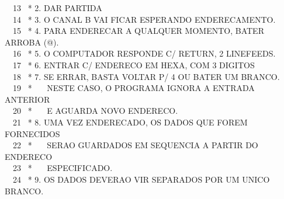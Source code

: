 \documentclass[a4paper,12pt]{article}
\begin{document}
\phantom \ \ 13 \ * 2. DAR PARTIDA\\
\phantom \ \ 14 \ * 3. O CANAL B VAI FICAR ESPERANDO ENDERECAMENTO.\\
\phantom \ \ 15 \ * 4. PARA ENDERECAR A QUALQUER MOMENTO, BATER ARROBA (@).\\
\phantom \ \ 16 \ * 5. O COMPUTADOR RESPONDE C/ RETURN, 2 LINEFEEDS.\\
\phantom \ \ 17 \ * 6. ENTRAR C/ ENDERECO EM HEXA, COM 3 DIGITOS\\
\phantom \ \ 18 \ * 7. SE ERRAR, BASTA VOLTAR P/ 4 OU BATER UM BRANCO.\\
\phantom \ \ 19 \ * \ \ \ NESTE CASO, O PROGRAMA IGNORA A ENTRADA ANTERIOR\\
\phantom \ \ 20 \ * \ \ \ E AGUARDA NOVO ENDERECO.\\
\phantom \ \ 21 \ * 8. UMA VEZ ENDERECADO, OS DADOS QUE FOREM FORNECIDOS\\
\phantom \ \ 22 \ * \ \ \ SERAO GUARDADOS EM SEQUENCIA A PARTIR DO ENDERECO\\
\phantom \ \ 23 \ * \ \ \ ESPECIFICADO.\\
\phantom \ \ 24 \ * 9. OS DADOS DEVERAO VIR SEPARADOS POR UM UNICO BRANCO.

\newpage

\noindent \\
\end{document}
